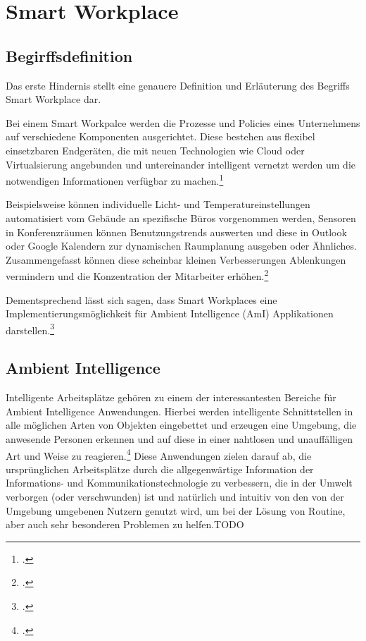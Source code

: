 \newpage
\section{Smart Workplace}
\subsection{Begirffsdefinition}
Das erste Hindernis stellt eine genauere Definition und Erläuterung des Begriffs Smart Workplace dar. 

Bei einem Smart Workpalce werden die Prozesse und Policies eines Unternehmens auf verschiedene Komponenten ausgerichtet. Diese bestehen aus flexibel einsetzbaren Endgeräten, die mit neuen Technologien wie Cloud oder Virtualsierung angebunden und untereinander intelligent vernetzt werden um die notwendigen Informationen verfügbar zu machen.\footcite[Vgl.][]{nextchange}

Beispielsweise können individuelle Licht- und Temperatureinstellungen automatisiert vom Gebäude an spezifische Büros vorgenommen werden, Sensoren in Konferenzräumen können Benutzungstrends auswerten und diese in Outlook oder Google Kalendern zur dynamischen Raumplanung ausgeben oder Ähnliches. Zusammengefasst können diese scheinbar kleinen Verbesserungen Ablenkungen vermindern und die Konzentration der Mitarbeiter erhöhen.\footcite[Vgl.][]{iotagenda}

Dementsprechend lässt sich sagen, dass Smart Workplaces eine Implementierungsmöglichkeit für Ambient Intelligence (AmI) Applikationen darstellen.\footcite[Vgl.][Seite 401]{leseprobe}

\subsection{Ambient Intelligence}
Intelligente Arbeitsplätze gehören zu einem der interessantesten Bereiche für Ambient Intelligence Anwendungen. 
Hierbei werden intelligente Schnittstellen in alle möglichen Arten von Objekten eingebettet und erzeugen eine Umgebung, die anwesende Personen erkennen und auf diese in einer nahtlosen und unauffälligen Art und Weise zu reagieren.\footcite[Vgl.][Seite 1]{istag} Diese Anwendungen zielen darauf ab, die ursprünglichen Arbeitsplätze durch die allgegenwärtige Information der Informations- und Kommunikationstechnologie zu verbessern, die in der Umwelt verborgen (oder verschwunden) ist und natürlich und intuitiv von den von der Umgebung umgebenen Nutzern genutzt wird, um bei der Lösung von Routine, aber auch sehr besonderen Problemen zu helfen.TODO

